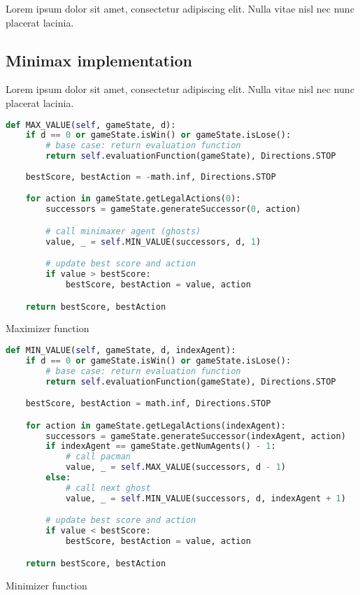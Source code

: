 \documentclass{article}
\begin{document}
Lorem ipsum dolor sit amet, consectetur adipiscing elit. Nulla vitae nisl nec nunc placerat lacinia.

\subsection{Minimax implementation}

Lorem ipsum dolor sit amet, consectetur adipiscing elit. Nulla vitae nisl nec nunc placerat lacinia.

\begin{table}[!ht]
\begin{lstlisting}[language=python, frame=tlbr, framesep=6pt, backgroundcolor=\color{light-gray}]
def MAX_VALUE(self, gameState, d):
    if d == 0 or gameState.isWin() or gameState.isLose():
        # base case: return evaluation function
        return self.evaluationFunction(gameState), Directions.STOP
    
    bestScore, bestAction = -math.inf, Directions.STOP

    for action in gameState.getLegalActions(0):
        successors = gameState.generateSuccessor(0, action)

        # call minimaxer agent (ghosts)
        value, _ = self.MIN_VALUE(successors, d, 1)

        # update best score and action
        if value > bestScore:
            bestScore, bestAction = value, action

    return bestScore, bestAction
\end{lstlisting}
\caption{Maximizer function}
\end{table}

\begin{table}[!ht]
\begin{lstlisting}[language=python, frame=tlbr, framesep=6pt, backgroundcolor=\color{light-gray}]
def MIN_VALUE(self, gameState, d, indexAgent):
    if d == 0 or gameState.isWin() or gameState.isLose():
        # base case: return evaluation function
        return self.evaluationFunction(gameState), Directions.STOP

    bestScore, bestAction = math.inf, Directions.STOP

    for action in gameState.getLegalActions(indexAgent):
        successors = gameState.generateSuccessor(indexAgent, action)
        if indexAgent == gameState.getNumAgents() - 1:
            # call pacman
            value, _ = self.MAX_VALUE(successors, d - 1)
        else:
            # call next ghost
            value, _ = self.MIN_VALUE(successors, d, indexAgent + 1)

        # update best score and action
        if value < bestScore:
            bestScore, bestAction = value, action

    return bestScore, bestAction
\end{lstlisting}
\caption{Minimizer function}
\end{table}
\end{document}
